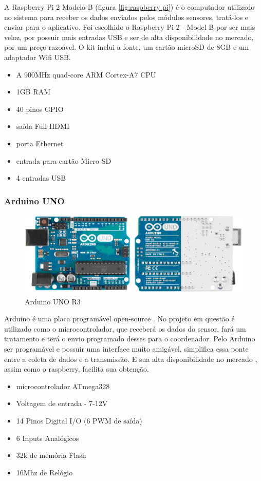 A Raspberry Pi 2 Modelo B (figura \ref{fig:raspberry pi}) é o computador utilizado no sistema para receber os dados enviados pelos módulos sensores, tratá-los e enviar para o aplicativo. Foi escolhido o Raspberry Pi 2 - Model B por ser mais veloz, por possuir mais entradas USB e ser de alta disponibilidade no mercado, por um preço razoável. O kit inclui a fonte, um cartão microSD de 8GB e um adaptador Wifi USB.

\begin{itemize}
\item{A 900MHz quad-core ARM Cortex-A7 CPU}
\item{1GB RAM}
\item{40 pinos GPIO}
\item{saída Full HDMI}
\item{porta Ethernet}
\item{entrada para cartão Micro SD}
\item{4 entradas USB}
\end{itemize}
%
\subsubsection{Arduino UNO}
\begin{figure}[H]
\includegraphics[width=1\textwidth]{figuras/arduino_uno.png}
\caption{\label{fig:arduino uno} Arduino UNO R3}
\end{figure}

Arduino é uma placa programável open-source . No projeto em questão é utilizado como o microcontrolador, que receberá os dados do sensor, fará um tratamento e terá o envio programado desses para o coordenador. Pelo Arduino ser programável e possuir uma interface muito amigável, simplifica essa ponte entre a coleta de dados e a transmissão. E sua alta disponibilidade no mercado , assim como o raspberry, facilita sua obtenção.

\begin{itemize}
\item{microcontrolador ATmega328}
\item{Voltagem de entrada - 7-12V}
\item{14 Pinos Digital I/O (6 PWM de saída)}
\item{6 Inputs Analógicos}
\item{32k de memória Flash}
\item{16Mhz de Relógio}
\end{itemize}
%
